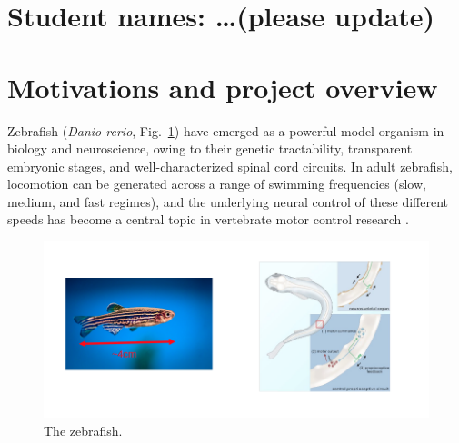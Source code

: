 \documentclass{cmc}
\begin{document}
\pagestyle{fancy}
 

\section*{Student names: \ldots (please update)}


\textit{
  \textbf{}
}

\section*{Motivations and project overview}\label{sec:exploring-swimming}

Zebrafish (\textit{Danio rerio}, Fig.~\ref{fig:zebrafish}) have emerged as a powerful model organism in biology and neuroscience, owing to their genetic tractability, transparent embryonic stages, and well-characterized spinal cord circuits. In adult zebrafish, locomotion can be generated across a range of swimming frequencies (slow, medium, and fast regimes), and the underlying neural control of these different speeds has become a central topic in vertebrate motor control research \cite{grillner2019current}.

\begin{figure}[H]
  \centering
  \includegraphics[width=1\textwidth]{figures/zebrafish.png}
  \caption[Zebrafish]{The zebrafish.}
  \label{fig:zebrafish}
\end{figure}
\end{document}
